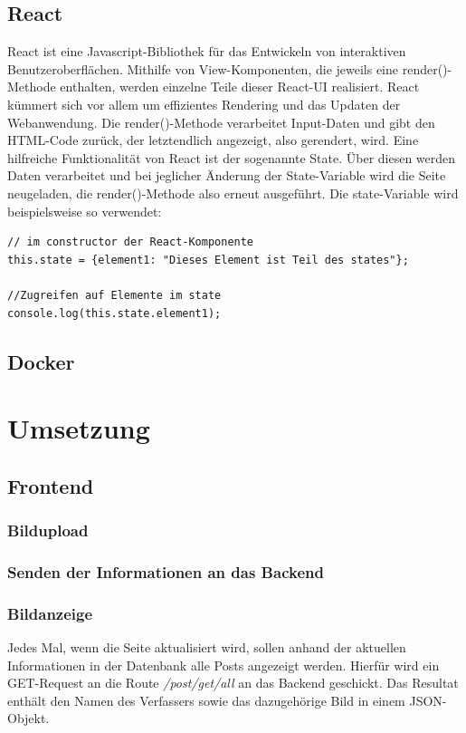 \documentclass[12pt,a4paper]{report}
\begin{document}
\section{React}
React ist eine Javascript-Bibliothek für das Entwickeln von interaktiven Benutzeroberflächen. Mithilfe von View-Komponenten, die jeweils eine render()-Methode enthalten, werden einzelne Teile dieser React-UI realisiert. React kümmert sich vor allem um effizientes Rendering und das Updaten der Webanwendung.
Die render()-Methode verarbeitet Input-Daten und gibt den HTML-Code zurück, der letztendlich angezeigt, also gerendert, wird.
Eine hilfreiche Funktionalität von React ist der sogenannte State. Über diesen werden Daten verarbeitet und bei jeglicher Änderung der State-Variable wird die Seite neugeladen, die render()-Methode also erneut ausgeführt.
Die state-Variable wird beispielsweise so verwendet:

\begin{verbatim}
// im constructor der React-Komponente
this.state = {element1: "Dieses Element ist Teil des states"};

//Zugreifen auf Elemente im state
console.log(this.state.element1);
\end{verbatim}


\section{Docker}

\newpage
\chapter{Umsetzung}

\section{Frontend}

\subsection{Bildupload}

\subsection{Senden der Informationen an das Backend}

\subsection{Bildanzeige}
Jedes Mal, wenn die Seite aktualisiert wird, sollen anhand der aktuellen Informationen in der Datenbank alle Posts angezeigt werden. Hierfür wird ein GET-Request an die Route \textit{/post/get/all} an das Backend geschickt. Das Resultat enthält den Namen des Verfassers sowie das dazugehörige Bild in einem JSON-Objekt.
\end{document}
